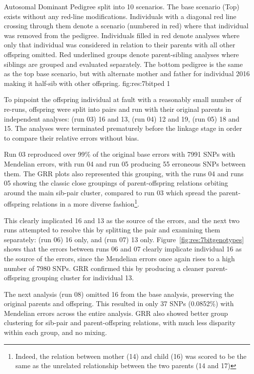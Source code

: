{Autosomal Dominant Pedigree split into 10 scenarios. The base scenario (Top) exists without any red-line modifications. Individuals with a diagonal red line crossing through them denote a scenario (numbered in red) where that individual was removed from the pedigree. Individuals filled in red denote analyses where only that individual was considered in relation to their parents with all other offspring omitted. Red underlined groups denote parent-sibling analyses where siblings are grouped and evaluated separately. The bottom pedigree is the same as the top base scenario, but with alternate mother and father  for individual 2016 making it half-sib with other offspring.}
{fig:res:7bitped}
{1}

\pagebreak
To pinpoint the offspring individual at fault with a reasonably small number of re-runs, offspring were split into pairs and run with their original parents in independent analyses: (run 03) 16 and 13, (run 04) 12 and 19, (run 05) 18 and 15. The analyses were terminated prematurely before the linkage stage in order to compare their relative errors without bias.

Run 03 reproduced over 99\% of the original base errors with 7991 SNPs with Mendelian errors, with run 04 and run 05 producing 55 erroneous SNPs between them. The GRR plots also represented this grouping, with the runs 04 and runs 05 showing the classic close groupings of parent-offspring relations orbiting around the main sib-pair cluster, compared to run 03 which spread the parent-offspring relations in a more diverse fashion\footnote{Indeed, the relation between mother (14) and child (16) was scored to be the same as the unrelated relationship between the two parents (14 and 17)}.

This clearly implicated 16 and 13 as the source of the errors, and the next two runs attempted to resolve this by splitting the pair and examining them separately: (run 06) 16 only, and (run 07) 13 only. Figure~\ref{fig:res:7bitgenotypes} shows that the errors between runs 06 and 07 clearly implicate individual 16 as the source of the errors, since the Mendelian errors once again rises to a high number of 7980 SNPs.  GRR confirmed this by producing a cleaner parent-offspring grouping cluster for individual 13.

The next analysis (run 08) omitted 16 from the base analysis, preserving the original parents and offspring. This resulted in only 37 SNPs (0.0852\%) with Mendelian errors across the entire analysis. GRR also showed better group clustering for sib-pair and parent-offspring relations, with much less disparity within each group, and no mixing.

